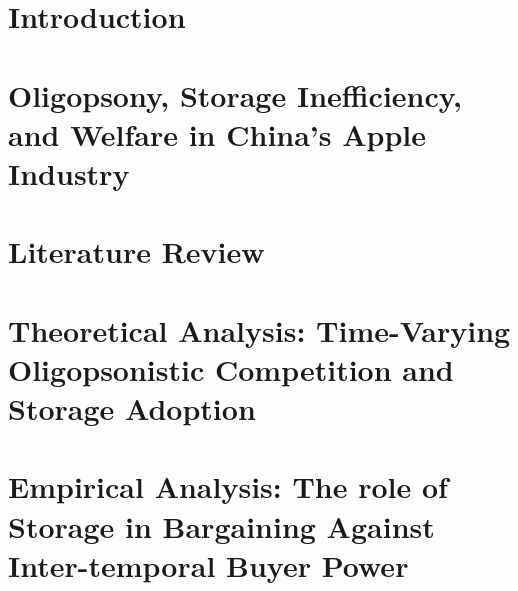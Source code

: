 \documentclass[12pt,authoryear, notitlepage]{elegantpaper}
\begin{document}

\clearpage
{}

\newpage
\chapter{Introduction} \label{Chapter: introduction}
    



\newpage
\chapter{Oligopsony, Storage Inefficiency, and Welfare in China's Apple Industry}
\label{Chapter: descriptive chapter}

    



\newpage
\chapter{Literature Review}

    


\newpage
\chapter{Theoretical Analysis: Time-Varying Oligopsonistic Competition and Storage Adoption}



    


\newpage
\chapter{Empirical Analysis: The role of Storage in Bargaining Against Inter-temporal Buyer Power}
\end{document}
